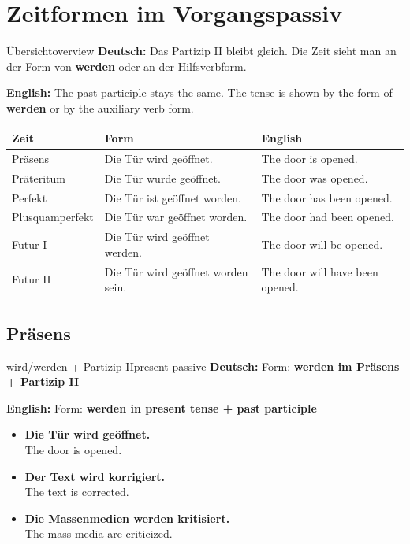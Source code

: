 \documentclass[a4paper,11pt]{article}
\newcommand{\GermanText}[1]{\textbf{Deutsch: }#1\par}
\newcommand{\EnglishText}[1]{{\small\color{SoftGray}\textbf{English: }#1\par}}
\newcommand{\ExampleItem}[2]{\item \textbf{#1}\\{\small\color{SoftGray}#2}}
\begin{document}
\section{Zeitformen im Vorgangspassiv}

\begin{grammarentry}{Übersicht}{overview}
\GermanText{Das Partizip II bleibt gleich. Die Zeit sieht man an der Form von \textbf{werden} oder an der Hilfsverbform.}
\EnglishText{The past participle stays the same. The tense is shown by the form of \textbf{werden} or by the auxiliary verb form.}

\begin{center}
\begin{tabular}{lll}
\textbf{Zeit} & \textbf{Form} & \textbf{English} \\
\hline
Präsens & Die Tür wird geöffnet. & The door is opened. \\
Präteritum & Die Tür wurde geöffnet. & The door was opened. \\
Perfekt & Die Tür ist geöffnet worden. & The door has been opened. \\
Plusquamperfekt & Die Tür war geöffnet worden. & The door had been opened. \\
Futur I & Die Tür wird geöffnet werden. & The door will be opened. \\
Futur II & Die Tür wird geöffnet worden sein. & The door will have been opened. \\
\end{tabular}
\end{center}
\end{grammarentry}

\subsection{Präsens}

\begin{grammarentry}{wird/werden + Partizip II}{present passive}
\GermanText{Form: \textbf{werden im Präsens + Partizip II}}
\EnglishText{Form: \textbf{werden in present tense + past participle}}

\begin{exbox}
\begin{itemize}
    \ExampleItem{Die Tür wird geöffnet.}{The door is opened.}
    \ExampleItem{Der Text wird korrigiert.}{The text is corrected.}
    \ExampleItem{Die Massenmedien werden kritisiert.}{The mass media are criticized.}
\end{itemize}
\end{exbox}
\end{grammarentry}
\end{document}
